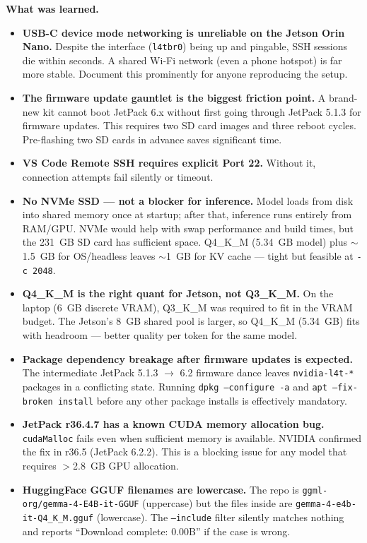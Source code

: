 \documentclass{article}
\theoremstyle{plain}
\theoremstyle{definition}
\theoremstyle{remark}
\begin{document}
\textbf{What was learned.}
\begin{itemize}
\item \textbf{USB-C device mode networking is unreliable on the Jetson Orin Nano.} Despite the interface (\texttt{l4tbr0}) being up and pingable, SSH sessions die within seconds. A shared Wi-Fi network (even a phone hotspot) is far more stable. Document this prominently for anyone reproducing the setup.
\item \textbf{The firmware update gauntlet is the biggest friction point.} A brand-new kit cannot boot JetPack 6.x without first going through JetPack 5.1.3 for firmware updates. This requires two SD card images and three reboot cycles. Pre-flashing two SD cards in advance saves significant time.
\item \textbf{VS Code Remote SSH requires explicit Port 22.} Without it, connection attempts fail silently or timeout.
\item \textbf{No NVMe SSD --- not a blocker for inference.} Model loads from disk into shared memory once at startup; after that, inference runs entirely from RAM/GPU. NVMe would help with swap performance and build times, but the 231~GB SD card has sufficient space. Q4\_K\_M (5.34~GB model) plus $\sim$1.5~GB for OS/headless leaves $\sim$1~GB for KV cache --- tight but feasible at \texttt{-c 2048}.
\item \textbf{Q4\_K\_M is the right quant for Jetson, not Q3\_K\_M.} On the laptop (6~GB discrete VRAM), Q3\_K\_M was required to fit in the VRAM budget. The Jetson's 8~GB shared pool is larger, so Q4\_K\_M (5.34~GB) fits with headroom --- better quality per token for the same model.
\item \textbf{Package dependency breakage after firmware updates is expected.} The intermediate JetPack 5.1.3 $\rightarrow$ 6.2 firmware dance leaves \texttt{nvidia-l4t-*} packages in a conflicting state. Running \texttt{dpkg --configure -a} and \texttt{apt --fix-broken install} before any other package installs is effectively mandatory.
\item \textbf{JetPack r36.4.7 has a known CUDA memory allocation bug.} \texttt{cudaMalloc} fails even when sufficient memory is available. NVIDIA confirmed the fix in r36.5 (JetPack 6.2.2). This is a blocking issue for any model that requires $>$2.8~GB GPU allocation.
\item \textbf{HuggingFace GGUF filenames are lowercase.} The repo is \texttt{ggml-org/gemma-4-E4B-it-GGUF} (uppercase) but the files inside are \texttt{gemma-4-e4b-it-Q4\_K\_M.gguf} (lowercase). The \texttt{--include} filter silently matches nothing and reports ``Download complete: 0.00B'' if the case is wrong.
\end{itemize}
\end{document}
